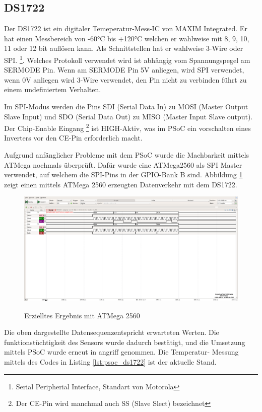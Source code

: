 \documentclass[12pt,a4paper,german]{article}
\begin{document}
\newpage
\subsection{DS1722}

	Der DS1722 ist ein digitaler Temeperatur-Mess-IC von MAXIM Integrated.
	Er hat einen Messbereich von -60°C bis +120°C welchen er wahlweise mit
	8, 9, 10, 11 oder 12 bit auflösen kann. Als Schnittstellen hat er
	wahlweise 3-Wire oder SPI.
	\footnote{Serial Peripherial Interface, Standart von Motorola}. Welches
	Protokoll verwendet wird ist abhängig vom Spannungspegel am SERMODE
	Pin. Wenn am SERMODE Pin 5V anliegen, wird SPI verwendet, wenn 0V
	anliegen wird 3-Wire verwendet, den Pin nicht zu verbinden führt zu einem
	undefiniertem Verhalten.

	Im SPI-Modus werden die Pins SDI (Serial Data In) zu MOSI 
	(Master Output Slave Input) und SDO (Serial Data Out) zu MISO
	(Master Input Slave output). Der Chip-Enable Eingang
	\footnote{Der CE-Pin wird manchmal auch SS (Slave Slect) bezeichnet}
	ist HIGH-Aktiv, was im PSoC ein vorschalten eines Inverters vor den 
	CE-Pin erforderlich macht.

	Aufgrund anfänglicher Probleme mit dem PSoC wurde die Machbarkeit
	mittels ATMega nochmals überprüft. Dafür wurde eine ATMega2560
	als SPI Master verwendet, auf welchem die SPI-Pins in der GPIO-Bank B
	sind. Abbildung \ref{fig:spi_frame_atmega} zeigt einen mittels ATMega
	2560 erzeugten Datenverkehr mit dem DS1722.
	
	 
	 \begin{figure}[H]
		\centering
		\includegraphics[width=1\textwidth]
			{measurements/spi_frame_recv_atmega}
		\label{fig:spi_frame_atmega}
		\caption{Erzielltes Ergebnis mit ATMega 2560}
	\end{figure}

	Die oben dargestellte Datensequenzentspricht erwarteten Werten. Die
	funktionstüchtigkeit des Sensors wurde dadurch bestätigt, und die
	Umsetzung mittels PSoC wurde erneut in angriff genommen. Die Temperatur-
	Messung mittels des Codes in Listing \ref{lst:psoc_ds1722} ist der
	aktuelle Stand.
\newpage
\end{document}
